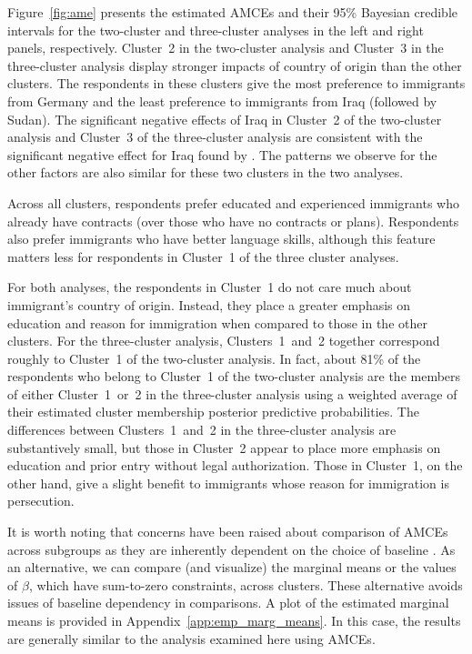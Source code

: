 Figure~\ref{fig:ame} presents the estimated AMCEs and their 95\%
Bayesian credible intervals for the two-cluster and three-cluster
analyses in the left and right panels, respectively. Cluster~2 in the
two-cluster analysis and Cluster~3 in the three-cluster analysis
display stronger impacts of country of origin than the other clusters.
The respondents in these clusters give the most preference to
immigrants from Germany and the least preference to immigrants from
Iraq (followed by Sudan).  The significant negative effects of Iraq in
Cluster~2 of the two-cluster analysis and Cluster~3 of the
three-cluster analysis are consistent with the significant negative
effect for Iraq found by \cite{hainmueller2015hidden}.  The patterns
we observe for the other factors are also similar for these two
clusters in the two analyses.

Across all clusters, respondents prefer educated and experienced
immigrants who already have contracts (over those who have no
contracts or plans).  Respondents also prefer immigrants who have
better language skills, although this feature matters less for
respondents in Cluster~1 of the three cluster analyses.

For both analyses, the respondents in Cluster~1 do not care much about
immigrant's country of origin.  Instead, they place a greater emphasis
on education and reason for immigration when compared to those in the
other clusters.  For the three-cluster analysis, Clusters~1~and~2
together correspond roughly to Cluster~1 of the two-cluster analysis.
In fact, about 81\% of the respondents who belong to Cluster~1 of the
two-cluster analysis are the members of either Cluster~1~or~2 in the
three-cluster analysis using a weighted average of their estimated cluster membership posterior predictive probabilities.  The differences between Clusters~1~and~2 in
the three-cluster analysis are substantively small, but those in
Cluster~2 appear to place more emphasis on education and prior entry
without legal authorization.  Those in Cluster~1, on the other hand,
give a slight benefit to immigrants whose reason for immigration is
persecution.

It is worth noting that concerns have been raised about comparison of
AMCEs across subgroups as they are inherently dependent on the choice
of baseline \citep{leeper2020measuring}.  As an alternative, we can
compare (and visualize) the marginal means or the values of $\beta$, which have
sum-to-zero constraints, across clusters.
These alternative avoids issues of baseline dependency in comparisons.
A plot of the estimated marginal means is provided in Appendix~\ref{app:emp_marg_means}.
In this case, the results are generally similar to the analysis examined here using AMCEs.


